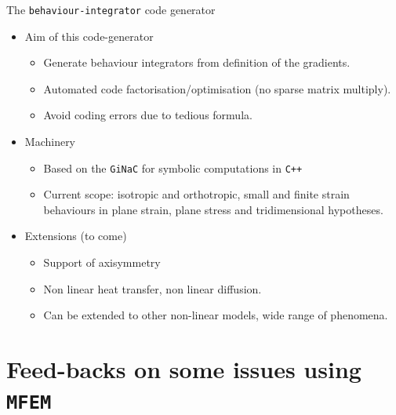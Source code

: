 \documentclass{beamer}
\begin{document}
\begin{frame}[fragile]{The
    \texttt{behaviour-integrator} code
    generator}
  \begin{itemize}
    \item Aim of this code-generator
    \begin{itemize}
      \item Generate behaviour integrators from definition of the gradients.
      \item Automated code factorisation/optimisation (no sparse matrix multiply).
      \item Avoid coding errors due to tedious formula.
    \end{itemize}
    \item Machinery
    \begin{itemize}
      \item Based on the \texttt{GiNaC} for symbolic
      computations in \texttt{C++}
      \item Current scope: isotropic and orthotropic, small
      and finite strain behaviours in plane strain, plane stress and
      tridimensional hypotheses.
    \end{itemize}
    \item Extensions (to come)
    \begin{itemize}
      \item Support of axisymmetry
      \item Non linear heat transfer, non linear diffusion.
      \item Can be extended to other non-linear models, wide
      range of phenomena.
    \end{itemize}
  \end{itemize}
\end{frame}

\section{Feed-backs on some issues using {\tt MFEM}}
\end{document}

